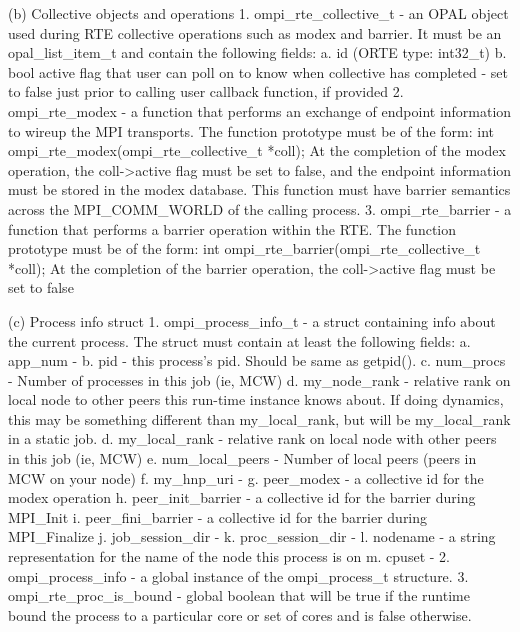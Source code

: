  (b) Collective objects and operations
     1. ompi_rte_collective_t - an OPAL object used during RTE collective operations
        such as modex and barrier. It must be an opal_list_item_t and contain the
        following fields:
           a. id (ORTE type: int32_t)
           b. bool active
              flag that user can poll on to know when collective
              has completed - set to false just prior to
              calling user callback function, if provided
     2. ompi_rte_modex - a function that performs an exchange of endpoint information
        to wireup the MPI transports. The function prototype must be of the form:
        int ompi_rte_modex(ompi_rte_collective_t *coll);
        At the completion of the modex operation, the coll->active flag must be set
        to false, and the endpoint information must be stored in the modex database.
        This function must have barrier semantics across the MPI_COMM_WORLD of the
        calling process.
     3. ompi_rte_barrier - a function that performs a barrier operation within the
        RTE. The function prototype must be of the form:
        int ompi_rte_barrier(ompi_rte_collective_t *coll);
        At the completion of the barrier operation, the coll->active flag must be set
        to false

 (c) Process info struct
     1. ompi_process_info_t - a struct containing info about the current process.
        The struct must contain at least the following fields:
           a. app_num -
           b. pid - this process's pid.  Should be same as getpid().
           c. num_procs - Number of processes in this job (ie, MCW)
           d. my_node_rank - relative rank on local node to other peers this run-time
                    instance knows about.  If doing dynamics, this may be something
                    different than my_local_rank, but will be my_local_rank in a
                    static job.
           d. my_local_rank - relative rank on local node with other peers in this job (ie, MCW)
           e. num_local_peers - Number of local peers (peers in MCW on your node)
           f. my_hnp_uri -
           g. peer_modex - a collective id for the modex operation
           h. peer_init_barrier - a collective id for the barrier during MPI_Init
           i. peer_fini_barrier - a collective id for the barrier during MPI_Finalize
           j. job_session_dir -
           k. proc_session_dir -
           l. nodename - a string representation for the name of the node this
              process is on
           m. cpuset -
     2. ompi_process_info - a global instance of the ompi_process_t structure.
     3. ompi_rte_proc_is_bound - global boolean that will be true if the runtime bound
        the process to a particular core or set of cores and is false otherwise.

